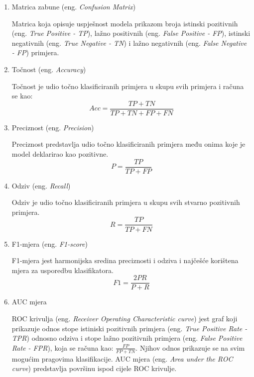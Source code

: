 \documentclass[utf8, diplomski, numeric]{fer}
\begin{document}
\begin{enumerate}
\item Matrica zabune (eng. \textit{Confusion Matrix})

Matrica koja opisuje uspješnost modela prikazom broja istinski pozitivnih (eng. \textit{True Positive - TP}), lažno positivnih (eng. \textit{False Positive - FP}), istinski negativnih (eng. \textit{True Negative - TN}) i lažno negativnih (eng.  \textit{False Negative - FP}) primjera.
\item Točnost (eng. \textit{Accuracy})

Točnost je udio točno klasificiranih primjera u skupu svih primjera i računa se kao:
\begin{equation*} \label{eq:accuracy}
Acc = \frac{TP+TN}{TP+TN+FP+FN}
\end{equation*}

\item Preciznost (eng. \textit{Precision})

Preciznost predstavlja udio točno klasificiranih primjera među onima koje je model deklarirao kao pozitivne.
\begin{equation*} \label{eq:precision}
P = \frac{TP}{TP+FP}
\end{equation*}

\item Odziv (eng. \textit{Recall})

Odziv je udio točno klasificiranih primjera u skupu svih stvarno pozitivnih primjera.
\begin{equation*} \label{eq:recall}
R = \frac{TP}{TP+FN}
\end{equation*}

\item F1-mjera (eng. \textit{F1-score})

F1-mjera jest harmonijska sredina preciznosti i odziva i najčešće korištena mjera za usporedbu klasifikatora.
\begin{equation*} \label{eq:f1}
F1 = \frac{2PR}{P+R}
\end{equation*}

\item AUC mjera

ROC krivulja (eng. \textit{Receiver Operating Characteristic curve}) jest graf koji prikazuje odnos stope istiniski pozitivnih primjera (eng. \textit{True Positive Rate - TPR}) odnosno odziva i stope lažno pozitivnih primjera (eng. \textit{False Positive Rate - FPR}), koja se računa kao: 
\begin{math}
\frac{FP}{FP+TN}
\end{math}. Njihov odnos prikazuje se na svim mogućim pragovima klasifikacije. AUC mjera (eng. \textit{Area under the ROC curve}) predstavlja površinu ispod cijele ROC krivulje.

\end{enumerate}
\end{document}
